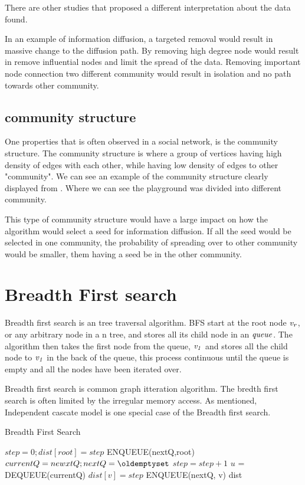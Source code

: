 There are other studies that proposed a different interpretation about the data found.	

In an example of information diffusion, a targeted removal would result in massive change to the diffusion path. By removing high degree node would result in remove influential nodes and limit the spread of the data. Removing important node connection two different community would result in isolation and no path towards other community.

\subsection{community structure}
One properties that is often observed in a social network, is the community structure. The community structure is where a group of vertices having high density of edges with each other, while having low density of edges to other "community". We can see an example of the community structure clearly displayed from \cite{RaceSchool2001}. Where we can see the playground was divided into different community.

This type of community structure would have a large impact on how the algorithm would select a seed for information diffusion. If all the seed would be selected in one community, the probability of spreading over to other community would be smaller, them having a seed be in the other community.

\section{Breadth First search}

Breadth first search is an tree traversal algorithm. BFS start at the root node $\it{v_r}$, or any arbitrary node in a n tree, and stores all its child node in an $\it{queue}$. The algorithm then takes the first node from the queue, $\it{v_1}$ and stores all the child node to $\it{v_1}$ in the back of the queue, this process continuous until the queue is empty and all the nodes have been iterated over. 

Breadth first search is common graph itteration algorithm. The bredth first search is often limited by the irregular memory access. As mentioned, Independent cascate model is one special case of the Breadth first search.

\begin{algorithm}
\caption{Breadth First Search}
\begin{algorithmic}[1]
\State $step = 0; dist[root] = step$
\State ENQUEUE(nextQ,root)
\State $currentQ = newxtQ; nextQ = \oldemptyset$
\State $step = step+1$
\State$ u$ = DEQUEUE(currentQ)
\State $dist[v] = step$
\State ENQUEUE(nextQ, v)
\EndIf
\EndFor
\EndWhile
\EndWhile
\Return dist
\end{algorithmic}
\end{algorithm}


